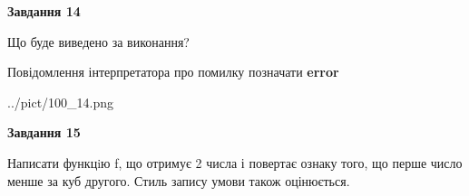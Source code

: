 \documentclass[11pt, ukrainian]{article}
\begin{document}
{\begin {large}
{\begin {center}\textbf{Завдання 14}\end {center}}\par
Що буде виведено за виконання? \par
Повідомлення інтерпретатора про помилку позначати \textbf{error}

\begin{center}
	{../pict/100_14.png}
\end{center}
\newpage

{\begin {center}\textbf{Завдання 15}\end {center}}\par

Написати функцiю f, що отримує 2 числа і повертає ознаку того, що перше число менше за куб другого. Стиль запису умови також оцінюється.\par
\newpage

\end {large}}
\end{document}
